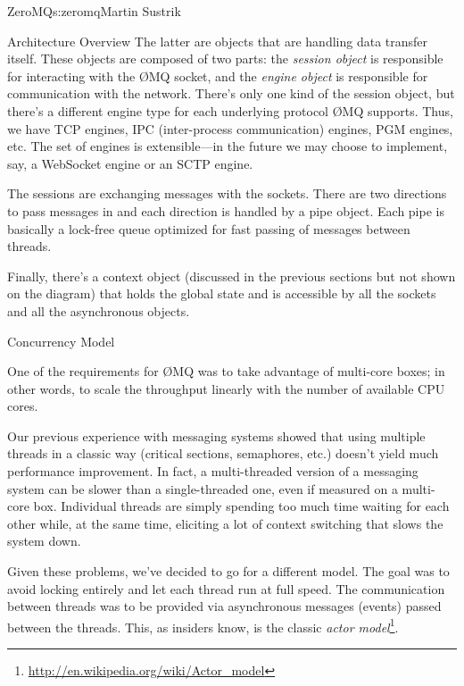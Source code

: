 \begin{aosachapter}{ZeroMQ}{s:zeromq}{Martin Sustrik}
\begin{aosasect1}{Architecture Overview}
The latter are objects that are handling data transfer itself. These
objects are composed of two parts: the \emph{session object} is responsible for
interacting with the {\O}MQ socket, and the \emph{engine object} is responsible for
communication with the network. There's only one kind of the session
object, but there's a different engine type for each underlying
protocol {\O}MQ supports. Thus, we have TCP engines, IPC (inter-process
communication) engines, PGM
engines, etc. The set of engines is extensible---in the future we may
choose to implement, say, a WebSocket engine or an SCTP engine.

The sessions are exchanging messages with the sockets. There are two
directions to pass messages in and each direction is handled by a pipe
object. Each pipe is basically a lock-free queue optimized for fast passing
of messages between threads.

Finally, there's a context object (discussed in the previous sections but
not shown on the diagram) that holds the global state and is
accessible by all the sockets and all the asynchronous objects.

\end{aosasect1}

\begin{aosasect1}{Concurrency Model}

One of the requirements for {\O}MQ was to take advantage of multi-core
boxes; in other words, to scale the throughput linearly with the number of
available CPU cores.

Our previous experience with messaging systems showed that using
multiple threads in a classic way (critical sections, semaphores, etc.)
doesn't yield much performance improvement. In fact, a multi-threaded
version of a messaging system can be slower than a single-threaded
one, even if measured on a multi-core box. Individual threads are
simply spending too much time waiting for each other while, at the
same time, eliciting a lot of context switching that slows the system
down.

Given these problems, we've decided to go for a different model. The
goal was to avoid locking entirely and let each thread run at full
speed. The communication between threads was to be provided via
asynchronous messages (events) passed between the threads. This, as
insiders know, is the classic \emph{actor
model}\footnote{\url{http://en.wikipedia.org/wiki/Actor_model}}.


\end{aosasect1}
\end{aosachapter}
